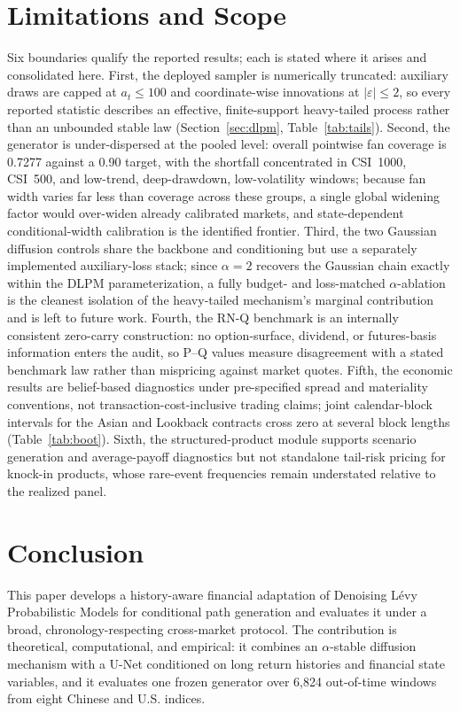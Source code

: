 ﻿\documentclass[12pt,letterpaper]{article}
\begin{document}
\section{Limitations and Scope}\label{sec:limitations}
Six boundaries qualify the reported results; each is stated where it arises
and consolidated here. First, the deployed sampler is numerically truncated:
auxiliary draws are capped at $a_t \le 100$ and coordinate-wise innovations
at $\lvert\varepsilon\rvert \le 2$, so every reported statistic describes an
effective, finite-support heavy-tailed process rather than an unbounded
stable law (Section~\ref{sec:dlpm}, Table~\ref{tab:tails}). Second, the
generator is under-dispersed at the pooled level: overall pointwise fan
coverage is 0.7277 against a 0.90 target, with the shortfall concentrated in
CSI~1000, CSI~500, and low-trend, deep-drawdown, low-volatility windows;
because fan width varies far less than coverage across these groups, a single
global widening factor would over-widen already calibrated markets, and
state-dependent conditional-width calibration is the identified frontier.
Third, the two Gaussian diffusion controls share the backbone and
conditioning but use a separately implemented auxiliary-loss stack; since
$\alpha = 2$ recovers the Gaussian chain exactly within the DLPM
parameterization, a fully budget- and loss-matched $\alpha$-ablation is the
cleanest isolation of the heavy-tailed mechanism's marginal contribution and
is left to future work. Fourth, the RN-Q benchmark is an internally
consistent zero-carry construction: no option-surface, dividend, or
futures-basis information enters the audit, so P--Q values measure
disagreement with a stated benchmark law rather than mispricing against
market quotes. Fifth, the economic results are belief-based diagnostics under
pre-specified spread and materiality conventions, not
transaction-cost-inclusive trading claims; joint calendar-block intervals for
the Asian and Lookback contracts cross zero at several block lengths
(Table~\ref{tab:boot}). Sixth, the structured-product module supports
scenario generation and average-payoff diagnostics but not standalone
tail-risk pricing for knock-in products, whose rare-event frequencies remain
understated relative to the realized panel.

\section{Conclusion}\label{sec:conclusion}
This paper develops a history-aware financial adaptation of Denoising L\'evy
Probabilistic Models for conditional path generation and evaluates it under a
broad, chronology-respecting
cross-market protocol. The contribution is theoretical, computational, and
empirical: it combines an $\alpha$-stable diffusion mechanism with a U-Net
conditioned on long return histories and financial state variables, and it
evaluates one frozen generator over 6{,}824 out-of-time windows from eight
Chinese and U.S. indices.
\end{document}
